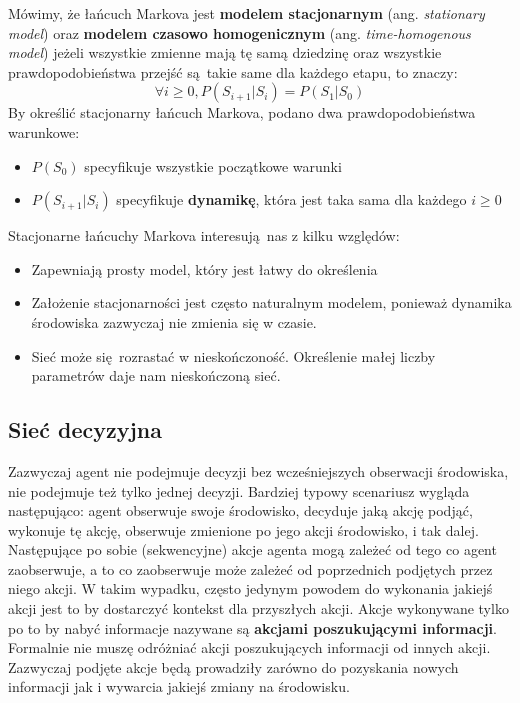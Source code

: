 \documentclass[a4paper, 12pt,oneside]{book}
\begin{document}
Mówimy, że łańcuch Markova jest \textbf{modelem stacjonarnym} (ang.
\textit{stationary model}) oraz \textbf{modelem czasowo homogenicznym } (ang.
\textit{time-homogenous model}) jeżeli wszystkie zmienne mają tę samą dziedzinę
oraz wszystkie prawdopodobieństwa przejść są takie same dla każdego etapu, to
znaczy:
\[\forall i \ge 0, P(S_{i+1}|S_i) = P(S_1|S_0)\]
By określić stacjonarny łańcuch Markova, podano dwa prawdopodobieństwa
warunkowe:
\begin{itemize}
		\setlength\itemsep{-0.4em}
	\item $P(S_0)$ specyfikuje wszystkie początkowe warunki
	\item $P(S_{i+1} | S_i)$ specyfikuje \textbf{dynamikę}, która jest taka
		sama dla każdego $i \ge 0$
\end{itemize}
Stacjonarne łańcuchy Markova interesują nas z kilku względów:
\begin{itemize}
		\setlength\itemsep{-0.4em}
	\item Zapewniają prosty model, który jest łatwy do określenia
	\item Założenie stacjonarności jest często naturalnym modelem, ponieważ
		dynamika środowiska zazwyczaj nie zmienia się w czasie.
	\item Sieć może się rozrastać w nieskończoność. Określenie małej liczby
		parametrów daje nam nieskończoną
		sieć\cite{ai_foundations_markov_chains}.
\end{itemize}

\subsection{Sieć decyzyjna}
Zazwyczaj agent nie podejmuje decyzji bez wcześniejszych obserwacji środowiska,
nie podejmuje też tylko jednej decyzji. Bardziej typowy scenariusz wygląda
następująco: agent obserwuje swoje środowisko, decyduje jaką akcję podjąć,
wykonuje tę akcję, obserwuje zmienione po jego akcji środowisko, i tak dalej.
Następujące po sobie (sekwencyjne) akcje agenta mogą zależeć od tego co agent
zaobserwuje, a to co zaobserwuje może zależeć od poprzednich podjętych przez
niego akcji. W takim wypadku, często jedynym powodem do wykonania jakiejś
akcji jest to by dostarczyć kontekst dla przyszłych akcji. Akcje wykonywane
tylko po to by nabyć informacje nazywane są \textbf{akcjami poszukującymi
informacji}. Formalnie nie muszę odróżniać akcji poszukujących informacji od
innych akcji. Zazwyczaj podjęte akcje będą prowadziły zarówno do pozyskania
nowych informacji jak i wywarcia jakiejś zmiany na środowisku.
\end{document}
